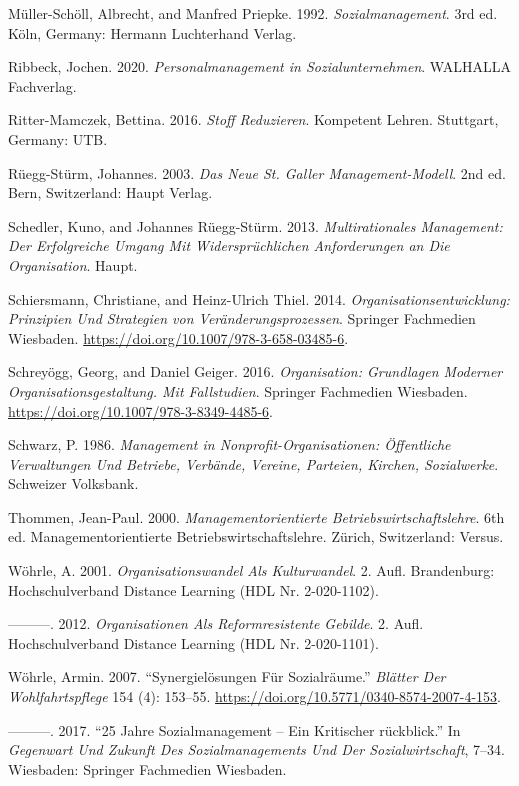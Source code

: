 \documentclass[
  letterpaper,
]{book}
\newlength{\cslhangindent}
\newenvironment{CSLReferences}[2] %
 {\begin{list}{}{%
  \setlength{\itemindent}{0pt}
  \setlength{\leftmargin}{0pt}
  \setlength{\parsep}{0pt}
  \ifodd #1
   \setlength{\leftmargin}{\cslhangindent}
   \setlength{\itemindent}{-1\cslhangindent}
  \fi
  \setlength{\itemsep}{#2\baselineskip}}}
 {\end{list}}
\begin{document}
\begin{CSLReferences}{1}{0}
Müller-Schöll, Albrecht, and Manfred Priepke. 1992.
\emph{Sozialmanagement}. 3rd ed. K{ö}ln, Germany: Hermann Luchterhand
Verlag.

Ribbeck, Jochen. 2020. \emph{Personalmanagement in Sozialunternehmen}.
WALHALLA Fachverlag.

Ritter-Mamczek, Bettina. 2016. \emph{Stoff Reduzieren}. Kompetent
Lehren. Stuttgart, Germany: UTB.

Rüegg-Stürm, Johannes. 2003. \emph{Das Neue St. Galler
{Management-Modell}}. 2nd ed. Bern, Switzerland: Haupt Verlag.

Schedler, Kuno, and Johannes Rüegg-Stürm. 2013. \emph{Multirationales
Management: Der Erfolgreiche Umgang Mit Widerspr{ü}chlichen
Anforderungen an Die Organisation}. Haupt.

Schiersmann, Christiane, and Heinz-Ulrich Thiel. 2014.
\emph{Organisationsentwicklung: Prinzipien Und Strategien von
Veränderungsprozessen}. Springer Fachmedien Wiesbaden.
\url{https://doi.org/10.1007/978-3-658-03485-6}.

Schreyögg, Georg, and Daniel Geiger. 2016. \emph{Organisation:
Grundlagen Moderner Organisationsgestaltung. Mit Fallstudien}. Springer
Fachmedien Wiesbaden. \url{https://doi.org/10.1007/978-3-8349-4485-6}.

Schwarz, P. 1986. \emph{Management in Nonprofit-Organisationen:
{Ö}ffentliche Verwaltungen Und Betriebe, Verb{ä}nde, Vereine, Parteien,
Kirchen, Sozialwerke}. Schweizer Volksbank.

Thommen, Jean-Paul. 2000. \emph{Managementorientierte
Betriebswirtschaftslehre}. 6th ed. Managementorientierte
Betriebswirtschaftslehre. Z{ü}rich, Switzerland: Versus.

Wöhrle, A. 2001. \emph{Organisationswandel Als Kulturwandel}. 2. Aufl.
Brandenburg: Hochschulverband Distance Learning (HDL Nr. 2-020-1102).

---------. 2012. \emph{Organisationen Als Reformresistente Gebilde}. 2.
Aufl. Hochschulverband Distance Learning (HDL Nr. 2-020-1101).

Wöhrle, Armin. 2007. {``Synergielösungen Für Sozialräume.''}
\emph{Blätter Der Wohlfahrtspflege} 154 (4): 153--55.
\url{https://doi.org/10.5771/0340-8574-2007-4-153}.

---------. 2017. {``25 Jahre Sozialmanagement -- Ein Kritischer
r{ü}ckblick.''} In \emph{Gegenwart Und Zukunft Des Sozialmanagements Und
Der Sozialwirtschaft}, 7--34. Wiesbaden: Springer Fachmedien Wiesbaden.

\end{CSLReferences}


\backmatter
\end{document}
